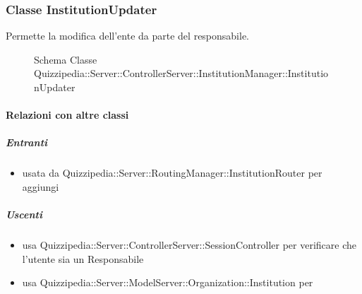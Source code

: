 \subsubsection{Classe InstitutionUpdater}
Permette la modifica dell'ente da parte del responsabile.
\begin{figure}[H]
\centering
\noindent{}
\caption[Schema Classe InstitutionUpdater]{Schema Classe Quizzipedia::Server::ControllerServer::InstitutionManager::InstitutionUpdater}
\end{figure}
\paragraph{Relazioni con altre classi}
\subparagraph{Entranti}
\begin{itemize}
\item usata da Quizzipedia::Server::RoutingManager::InstitutionRouter per aggiungi
\end{itemize}
\subparagraph{Uscenti}
\begin{itemize}
\item usa Quizzipedia::Server::ControllerServer::SessionController per verificare che l'utente sia un Responsabile
\item usa Quizzipedia::Server::ModelServer::Organization::Institution per 
\end{itemize}
